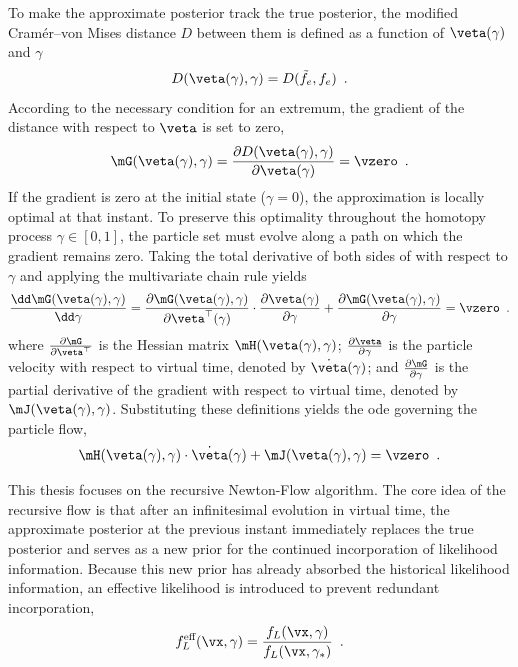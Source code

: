 To make the approximate posterior track the true posterior, the modified Cramér--von Mises distance $D$ between them is defined as a function of $\veta(\gamma)$ and $\gamma$
\begin{equation}
	D(\veta(\gamma), \gamma) = D(\tilde{f}_e, f_e) \enspace.
\end{equation}
According to the necessary condition for an extremum, the gradient of the distance with respect to $\veta$ is set to zero,
\begin{equation}
	\mG(\veta(\gamma), \gamma) = \frac{\partial D(\veta(\gamma), \gamma)}{\partial \veta(\gamma)} = \vzero \enspace.
	\label{eq:gradient_equation}
\end{equation}
If the gradient is zero at the initial state ($\gamma=0$), the approximation is locally optimal at that instant. To preserve this optimality throughout the homotopy process $\gamma \in [0,1]$, the particle set must evolve along a path on which the gradient remains zero. Taking the total derivative of both sides of  with respect to $\gamma$ and applying the multivariate chain rule yields
\begin{equation}
	\frac{\dd\mG(\veta(\gamma), \gamma)}{\dd\gamma} = \frac{\partial \mG(\veta(\gamma), \gamma)}{\partial \veta^{\top}(\gamma)} \cdot \frac{\partial \veta(\gamma)}{\partial \gamma} + \frac{\partial \mG(\veta(\gamma), \gamma)}{\partial \gamma} = \vzero \enspace.
\end{equation}
where $\frac{\partial \mG}{\partial \veta^{\top}}$ is the Hessian matrix $\mH(\veta(\gamma), \gamma)$; $\frac{\partial \veta}{\partial \gamma}$ is the particle velocity with respect to virtual time, denoted by $\dot{\veta}(\gamma)$; and $\frac{\partial \mG}{\partial \gamma}$ is the partial derivative of the gradient with respect to virtual time, denoted by $\mJ(\veta(\gamma), \gamma)$. Substituting these definitions yields the \ac{ode} governing the particle flow,
\begin{equation}
	\mH(\veta(\gamma), \gamma) \cdot \dot{\veta}(\gamma) + \mJ(\veta(\gamma), \gamma) = \vzero \enspace.
\end{equation}

This thesis focuses on the recursive Newton-Flow algorithm. The core idea of the recursive flow is that after an infinitesimal evolution in virtual time, the approximate posterior at the previous instant immediately replaces the true posterior and serves as a new prior for the continued incorporation of likelihood information. Because this new prior has already absorbed the historical likelihood information, an effective likelihood is introduced to prevent redundant incorporation,
\begin{equation}
	f_L^\text{eff}(\vx, \gamma) = \frac{f_L(\vx, \gamma)}{f_L(\vx, \gamma_*)} \enspace.
\end{equation}

